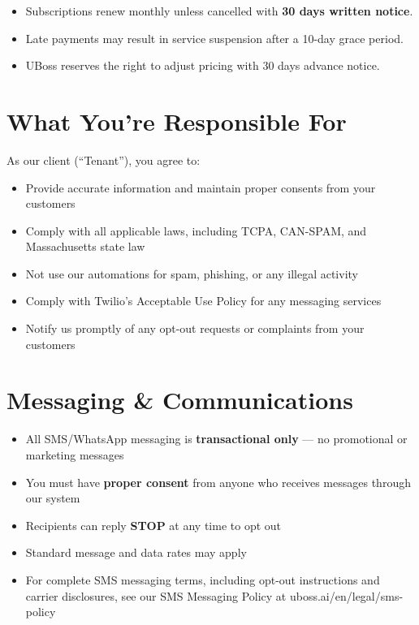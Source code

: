 \documentclass[11pt,letterpaper]{scrartcl}
\begin{document}
\begin{itemize}[nosep, leftmargin=1.5em]
    \item Subscriptions renew monthly unless cancelled with \textbf{30 days written notice}.
    \item Late payments may result in service suspension after a 10-day grace period.
    \item UBoss reserves the right to adjust pricing with 30 days advance notice.
\end{itemize}

\section{What You're Responsible For}

As our client (``Tenant''), you agree to:

\begin{itemize}[nosep, leftmargin=1.5em]
    \item Provide accurate information and maintain proper consents from your customers
    \item Comply with all applicable laws, including TCPA, CAN-SPAM, and Massachusetts state law
    \item Not use our automations for spam, phishing, or any illegal activity
    \item Comply with Twilio's Acceptable Use Policy for any messaging services
    \item Notify us promptly of any opt-out requests or complaints from your customers
\end{itemize}

\section{Messaging \& Communications}

\begin{tcolorbox}[keyterm, title={Important --- Messaging Rules}]
\begin{itemize}[nosep, leftmargin=1.5em]
    \item All SMS/WhatsApp messaging is \textbf{transactional only} --- no promotional or marketing messages
    \item You must have \textbf{proper consent} from anyone who receives messages through our system
    \item Recipients can reply \textbf{STOP} at any time to opt out
    \item Standard message and data rates may apply
    \item For complete SMS messaging terms, including opt-out instructions and carrier disclosures, see our SMS Messaging Policy at uboss.ai/en/legal/sms-policy
\end{itemize}
\end{tcolorbox}
\end{document}
